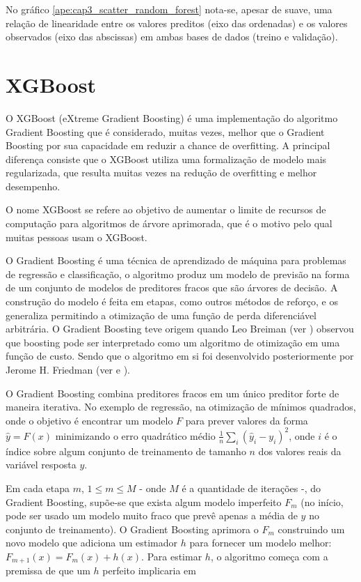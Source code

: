 No gráfico \ref{ape:cap3_scatter_random_forest} nota-se, apesar de suave, uma relação de linearidade entre os valores preditos (eixo das ordenadas) e os valores observados (eixo das abscissas) em ambas bases de dados (treino e validação).

\section{XGBoost}
\label{sec:xgboost}

O XGBoost (eXtreme Gradient Boosting) é uma implementação do algoritmo Gradient Boosting que é considerado, muitas vezes, melhor que o Gradient Boosting por sua capacidade em reduzir a chance de overfitting. A principal diferença consiste que o XGBoost utiliza uma formalização de modelo mais regularizada, que resulta muitas vezes na redução de overfitting e melhor desempenho.

O nome XGBoost se refere ao objetivo de aumentar o limite de recursos de computação para algoritmos de árvore aprimorada, que é o motivo pelo qual muitas pessoas usam o XGBoost.

O Gradient Boosting é uma técnica de aprendizado de máquina para problemas de regressão e classificação, o algoritmo produz um modelo de previsão na forma de um conjunto de modelos de preditores fracos que são árvores de decisão. A construção do modelo é feita em etapas, como outros métodos de reforço, e os generaliza permitindo a otimização de uma função de perda diferenciável arbitrária. O Gradient Boosting teve origem quando Leo Breiman (ver \citet{Breiman1997}) observou que boosting pode ser interpretado como um algoritmo de otimização em uma função de custo. Sendo que o algoritmo em si foi desenvolvido posteriormente por Jerome H. Friedman (ver \citet{Friedman199902} e \citet{Friedman199903}).

O Gradient Boosting combina preditores fracos em um único preditor forte de maneira iterativa. No exemplo de regressão, na otimização de mínimos quadrados, onde o objetivo é encontrar um modelo $ F $ para prever valores da forma $ \hat{y} = F(x) $ minimizando o erro quadrático médio $ \tfrac{1}{n} \sum_{i} ({\hat{y}}_{i}-y_{i})^{2} $, onde $ i $ é o índice sobre algum conjunto de treinamento de tamanho $ n $ dos valores reais da variável resposta $ y $.

Em cada etapa $ m $, $ 1 \leq m \leq M $ - onde $ M $ é a quantidade de iterações -, do Gradient Boosting, supõe-se que exista algum modelo imperfeito $ F_{m} $ (no início, pode ser usado um modelo muito fraco que prevê apenas a média de $ y $ no conjunto de treinamento). O Gradient Boosting aprimora o $ F_{m} $ construindo um novo modelo que adiciona um estimador $ h $ para fornecer um modelo melhor: $ F_{m + 1}(x) = F_{m}(x) + h(x) $. Para estimar $ h $, o algoritmo começa com a premissa de que um $ h $ perfeito implicaria em

